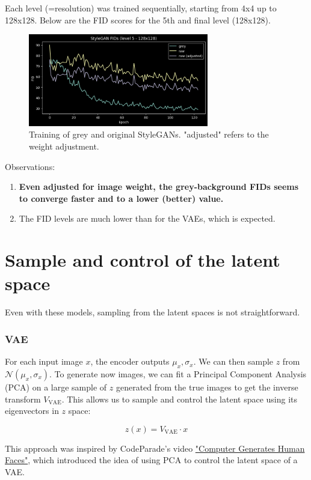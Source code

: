 \documentclass{article}
\begin{document}
Each level (=resolution) was trained sequentially, starting from 4x4 up to 128x128. Below are the FID scores for the 5th and final level (128x128).

\begin{figure}[H]
    \centering
    \includegraphics[width=0.7\textwidth]{images/stylegan_fids.png}
    \caption{Training of grey and original StyleGANs. "adjusted" refers to the weight adjustment.}
\end{figure}

Observations:
\begin{enumerate}
  \item \textbf{Even adjusted for image weight, the grey-background FIDs seems to converge faster and to a lower (better) value.}
  \item The FID levels are much lower than for the VAEs, which is expected.
\end{enumerate}

\section{Sample and control of the latent space}

Even with these models, sampling from the latent spaces is not straightforward.

\subsubsection*{VAE}

For each input image $x$, the encoder outputs $\mu_x, \sigma_x$. We can then sample $z$ from $\mathcal{N}(\mu_x, \sigma_x)$.
To generate now images, we can fit a Principal Component Analysis (PCA) on a large sample of $z$ generated from the true images to get the inverse transform $V_{\text{VAE}}$.
This allows us to sample and control the latent space using its eigenvectors in $z$ space:

\[z(x) = V_{\text{VAE}} \cdot x\]

This approach was inspired by CodeParade's video \href{https://www.youtube.com/watch?v=4VAkrUNLKSo}{"Computer Generates Human Faces"}, which introduced the idea of using PCA to control the latent space of a VAE.
\end{document}
